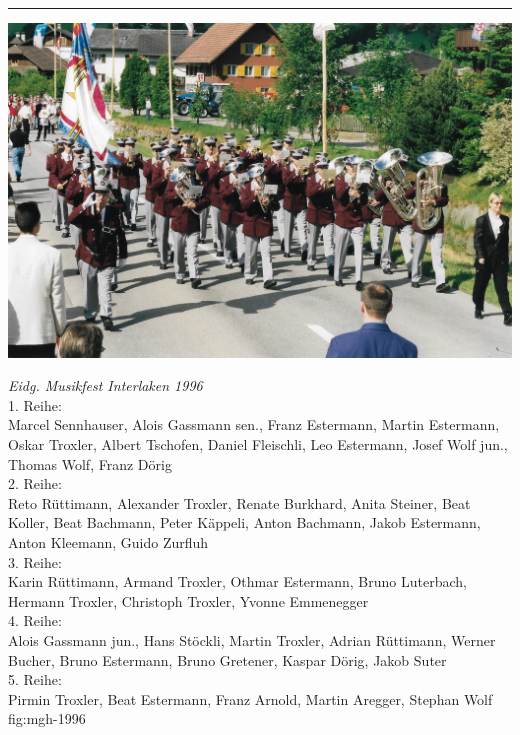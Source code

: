 \begin{history}
    \par\noindent\rule{\linewidth}{0.4pt}

    \begin{MulticolFigure}
        \centering
        \includegraphics[width=0.85\linewidth]{./chap/1975-2000/1998/MGH-Musiktag-Hergiswil-1998.jpg}
    \end{MulticolFigure}

\end{history}

{\emph{Eidg. Musikfest Interlaken 1996}\\
    1. Reihe:\\
    Marcel Sennhauser, Alois Gassmann sen., Franz Estermann, Martin Estermann,
    Oskar Troxler, Albert Tschofen, Daniel Fleischli, Leo Estermann, Josef Wolf
    jun., Thomas Wolf, Franz Dörig\\
    2. Reihe:\\
    Reto Rüttimann, Alexander Troxler, Renate Burkhard, Anita Steiner, Beat
    Koller, Beat Bachmann, Peter Käppeli, Anton Bachmann, Jakob Estermann, Anton
    Kleemann, Guido Zurfluh\\
    3. Reihe:\\
    Karin Rüttimann, Armand Troxler, Othmar Estermann, Bruno Luterbach, Hermann
    Troxler, Christoph Troxler, Yvonne Emmenegger\\
    4. Reihe:\\
    Alois Gassmann jun., Hans Stöckli, Martin Troxler, Adrian Rüttimann, Werner
    Bucher, Bruno Estermann, Bruno Gretener, Kaspar Dörig, Jakob Suter\\
    5. Reihe:\\
    Pirmin Troxler, Beat Estermann, Franz Arnold, Martin Aregger, Stephan Wolf }
{fig:mgh-1996}


